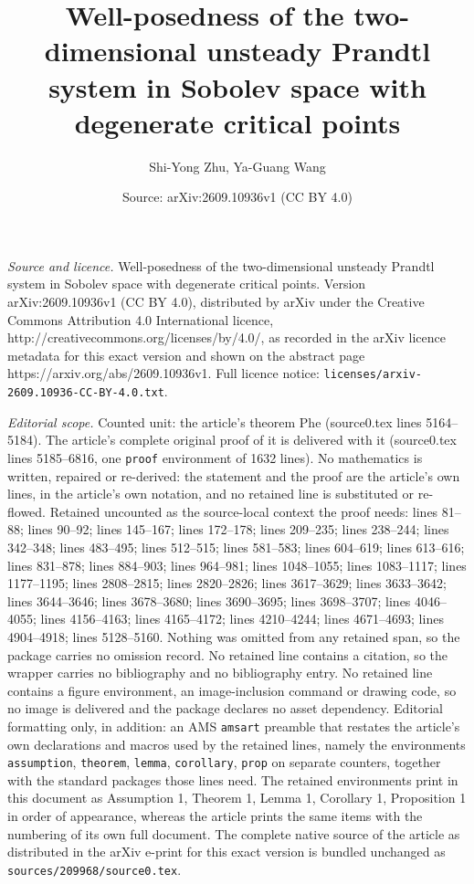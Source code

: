 \documentclass[10pt,a4paper]{amsart}
\title{Well-posedness of the two-dimensional unsteady Prandtl system in Sobolev space with degenerate critical points}
\author{Shi-Yong Zhu, Ya-Guang Wang}
\date{Source: arXiv:2609.10936v1 (CC BY 4.0)}
\begin{document}
\maketitle

\noindent\emph{Source and licence.} Well-posedness of the two-dimensional unsteady Prandtl system in Sobolev space with degenerate critical points. Version arXiv:2609.10936v1 (CC BY 4.0), distributed by arXiv under the Creative Commons Attribution 4.0 International licence, http://creativecommons.org/licenses/by/4.0/, as recorded in the arXiv licence metadata for this exact version and shown on the abstract page https://arxiv.org/abs/2609.10936v1. Full licence notice: \texttt{licenses/arxiv-2609.10936-CC-BY-4.0.txt}.\par\smallskip

\noindent\textit{Editorial scope.} Counted unit: the article's theorem Phe (source0.tex lines 5164--5184). The article's complete original proof of it is delivered with it (source0.tex lines 5185--6816, one \texttt{proof} environment of 1632 lines). No mathematics is written, repaired or re-derived: the statement and the proof are the article's own lines, in the article's own notation, and no retained line is substituted or re-flowed.  Retained uncounted as the source-local context the proof needs: lines 81--88; lines 90--92; lines 145--167; lines 172--178; lines 209--235; lines 238--244; lines 342--348; lines 483--495; lines 512--515; lines 581--583; lines 604--619; lines 613--616; lines 831--878; lines 884--903; lines 964--981; lines 1048--1055; lines 1083--1117; lines 1177--1195; lines 2808--2815; lines 2820--2826; lines 3617--3629; lines 3633--3642; lines 3644--3646; lines 3678--3680; lines 3690--3695; lines 3698--3707; lines 4046--4055; lines 4156--4163; lines 4165--4172; lines 4210--4244; lines 4671--4693; lines 4904--4918; lines 5128--5160.  Nothing was omitted from any retained span, so the package carries no omission record.  No retained line contains a citation, so the wrapper carries no bibliography and no bibliography entry.  No retained line contains a figure environment, an image-inclusion command or drawing code, so no image is delivered and the package declares no asset dependency.  Editorial formatting only, in addition: an AMS \texttt{amsart} preamble that restates the article's own declarations and macros used by the retained lines, namely the environments \texttt{assumption}, \texttt{theorem}, \texttt{lemma}, \texttt{corollary}, \texttt{prop} on separate counters, together with the standard packages those lines need.  The retained environments print in this document as Assumption 1, Theorem 1, Lemma 1, Corollary 1, Proposition 1 in order of appearance, whereas the article prints the same items with the numbering of its own full document.  The complete native source of the article as distributed in the arXiv e-print for this exact version is bundled unchanged as \texttt{sources/209968/source0.tex}.
\end{document}
